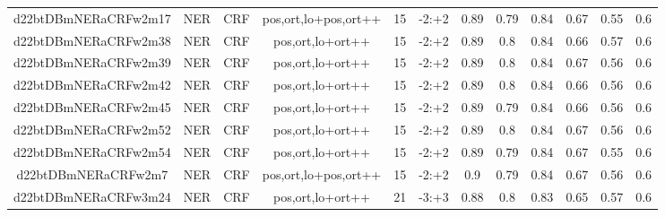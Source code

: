 \documentclass[a4paper]{article}
\begin{document}
\begin{landscape}
\begin{center}
\begin{tabular}{ |c|c|c|c|c|c|c|c|c|c|c|c|}
 
 	
 	\small{ d22btDBmNERaCRFw2m17 } & \small{ NER} & \small{  CRF }  & pos,ort,lo+pos,ort++  &  15 &  \small{  -2:+2 }  &  0.89 & 0.79 & 0.84  &  0.67 & 0.55 & 0.6 \\
 	

 
 	
 	\small{ d22btDBmNERaCRFw2m38 } & \small{ NER} & \small{  CRF }  & pos,ort,lo+ort++  &  15 &  \small{  -2:+2 }  &  0.89 & 0.8 & 0.84  &  0.66 & 0.57 & 0.6 \\
 	

 
 	
 	\small{ d22btDBmNERaCRFw2m39 } & \small{ NER} & \small{  CRF }  & pos,ort,lo+ort++  &  15 &  \small{  -2:+2 }  &  0.89 & 0.8 & 0.84  &  0.67 & 0.56 & 0.6 \\
 	

 
 	
 	\small{ d22btDBmNERaCRFw2m42 } & \small{ NER} & \small{  CRF }  & pos,ort,lo+ort++  &  15 &  \small{  -2:+2 }  &  0.89 & 0.8 & 0.84  &  0.66 & 0.56 & 0.6 \\
 	

 
 	
 	\small{ d22btDBmNERaCRFw2m45 } & \small{ NER} & \small{  CRF }  & pos,ort,lo+ort++  &  15 &  \small{  -2:+2 }  &  0.89 & 0.79 & 0.84  &  0.66 & 0.56 & 0.6 \\
 	

 
 	
 	\small{ d22btDBmNERaCRFw2m52 } & \small{ NER} & \small{  CRF }  & pos,ort,lo+ort++  &  15 &  \small{  -2:+2 }  &  0.89 & 0.8 & 0.84  &  0.67 & 0.56 & 0.6 \\
 	

 
 	
 	\small{ d22btDBmNERaCRFw2m54 } & \small{ NER} & \small{  CRF }  & pos,ort,lo+ort++  &  15 &  \small{  -2:+2 }  &  0.89 & 0.79 & 0.84  &  0.67 & 0.55 & 0.6 \\
 	

 
 	
 	\small{ d22btDBmNERaCRFw2m7 } & \small{ NER} & \small{  CRF }  & pos,ort,lo+pos,ort++  &  15 &  \small{  -2:+2 }  &  0.9 & 0.79 & 0.84  &  0.67 & 0.56 & 0.6 \\
 	

 
 	
 	\small{ d22btDBmNERaCRFw3m24 } & \small{ NER} & \small{  CRF }  & pos,ort,lo+ort++  &  21 &  \small{  -3:+3 }  &  0.88 & 0.8 & 0.83  &  0.65 & 0.57 & 0.6 \\
 	


\end{tabular}
\end{center}
\end{landscape}
\end{document}
